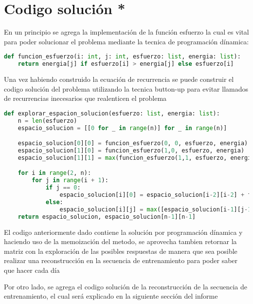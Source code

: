 \section{Codigo solución *}

En un principio se agrega la implementación de la función esfuerzo la cual es vital para poder solucionar el problema mediante la tecnica de programación dínamica:


\begin{lstlisting}[language=Python]
def funcion_esfuerzo(i: int, j: int, esfuerzo: list, energia: list):
    return energia[j] if esfuerzo[i] > energia[j] else esfuerzo[i]
\end{lstlisting}

Una vez habiendo construido la ecuación de recurrencia se puede construir el codigo solución del problema utilizando la tecnica button-up para evitar llamados de recurrencias inecesarios que realenticen el problema

\begin{lstlisting}[language=Python]
def explorar_espacion_solucion(esfuerzo: list, energia: list):
    n = len(esfuerzo)
    espacio_solucion = [[0 for _ in range(n)] for _ in range(n)]

    espacio_solucion[0][0] = funcion_esfuerzo(0, 0, esfuerzo, energia)
    espacio_solucion[1][0] = funcion_esfuerzo(1,0, esfuerzo, energia)
    espacio_solucion[1][1] = max(funcion_esfuerzo(1,1, esfuerzo, energia) + espacio_solucion[0][0], espacio_solucion[1][0])

    for i in range(2, n):
        for j in range(i + 1):
            if j == 0:
                espacio_solucion[i][0] = espacio_solucion[i-2][i-2] + funcion_esfuerzo(i, 0, esfuerzo, energia)
            else:
                espacio_solucion[i][j] = max([espacio_solucion[i-1][j-1] + funcion_esfuerzo(i, j, esfuerzo, energia), espacio_solucion[i][j-1], espacio_solucion[i-2][j-2] + funcion_esfuerzo(i,0, esfuerzo, energia)])
    return espacio_solucion, espacio_solucion[n-1][n-1]
\end{lstlisting}

El codigo anteriormente dado contiene la solución por programación dínamica y haciendo uso de la memoización del metodo, se aprovecha tambien retornar la matriz con la exploración de las posibles respuestas de manera que sea posible realizar una reconstrucción en la secuencia de entrenamiento para poder saber que hacer cada día

Por otro lado, se agrega el codigo solución de la reconstrucción de la secuencia de entrenamiento, el cual será explicado en la siguiente sección del informe

